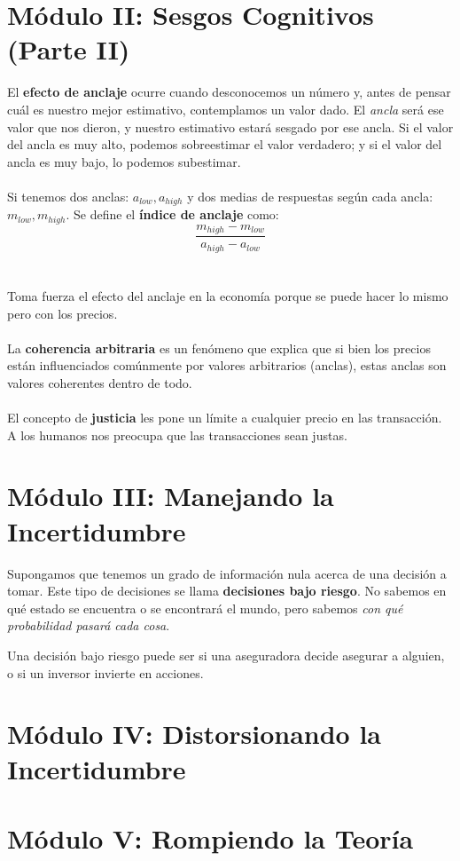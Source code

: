 \documentclass{article}
\begin{document}
    \section*{Módulo II: Sesgos Cognitivos (Parte II)}
        El \textbf{efecto de anclaje} ocurre cuando desconocemos un número y, antes de pensar cuál es nuestro mejor estimativo, contemplamos un valor dado. El \emph{ancla} será ese valor que nos dieron, y nuestro estimativo estará sesgado por ese ancla. Si el valor del ancla es muy alto, podemos sobreestimar el valor verdadero; y si el valor del ancla es muy bajo, lo podemos subestimar.
        \\
        \\
        Si tenemos dos anclas: $a_{low}, a_{high}$ y dos medias de respuestas según cada ancla: $m_{low}, m_{high}$. Se define el \textbf{índice de anclaje} como:
        \[\frac{m_{high} - m_{low}}{a_{high} - a_{low}}\]
        \\
        \\
        Toma fuerza el efecto del anclaje en la economía porque se puede hacer lo mismo pero con los precios.
        \\
        \\
        La \textbf{coherencia arbitraria} es un fenómeno que explica que si bien los precios están influenciados comúnmente por valores arbitrarios (anclas), estas anclas son valores coherentes dentro de todo.
        \\
        \\
        El concepto de \textbf{justicia} les pone un límite a cualquier precio en las transacción. A los humanos nos preocupa que las transacciones sean justas.

    \section*{Módulo III: Manejando la Incertidumbre}
        Supongamos que tenemos un grado de información nula acerca de una decisión a tomar. Este tipo de decisiones se llama \textbf{decisiones bajo riesgo}. No sabemos en qué estado se encuentra o se encontrará el mundo, pero sabemos \emph{con qué probabilidad pasará cada cosa}.

        Una decisión bajo riesgo puede ser si una aseguradora decide asegurar a alguien, o si un inversor invierte en acciones.

    \section*{Módulo IV: Distorsionando la Incertidumbre}

    \section*{Módulo V: Rompiendo la Teoría}
        
    
\end{document}
